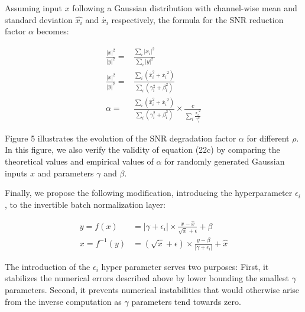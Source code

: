 \documentclass[twocolumn]{bmcart}
\begin{document}
Assuming input $x$ following a Gaussian distribution with channel-wise mean and standard deviation 
$\hat{x_i}$ and $\dot{x_i}$ respectively, the formula for the SNR reduction factor $\alpha$ becomes: 

\begin{subequations}
\begin{align}
\frac{|x|^2}{|y|^2} =& \frac{\sum_i |x_i|^2}{\sum_i|y|^2} \\
\frac{|x|^2}{|y|^2} =& \frac{\sum_i (\hat{x}_i^2 + \dot{x_i}^2)}{\sum_i (\gamma_i^2 + \beta_i^2)} \\
\alpha              =& \frac{\sum_i (\hat{x}_i^2 + \dot{x_i}^2)}{\sum_i (\gamma_i^2 + \beta_i^2)} \times \frac{c}{\sum_i \frac{\dot{x_i}^2}{\gamma_i^2}}
\end{align}
\end{subequations}

Figure 5 illustrates the evolution of the SNR degradation factor $\alpha$ for different $\rho$.
In this figure, we also verify the validity of equation (22c) by comparing the theoretical values and empirical values of $\alpha$ for randomly generated Gaussian inputs $x$ and parameters $\gamma$ and $\beta$.

Finally, we propose the following modification, introducing the hyperparameter $\epsilon_i$, to the invertible batch normalization layer:

\begin{subequations}
\begin{align}
y = f(x) &= |\gamma + \epsilon_i| \times \frac{x - \hat{x}}{\sqrt{\dot{x}} + \epsilon} + \beta \\
x = f^{-1}(y) &= (\sqrt{\dot{x}} + \epsilon) \times \frac{y -  \beta}{|\gamma + \epsilon_i|}  + \hat{x}
\end{align}
\end{subequations}

The introduction of the $\epsilon_i$ hyper parameter serves two purposes: 
First, it stabilizes the numerical errors described above by lower bounding the smallest $\gamma$ parameters. 
Second, it prevents numerical instabilities that would otherwise arise from the inverse computation as $\gamma$ parameters tend towards zero.
\end{document}
